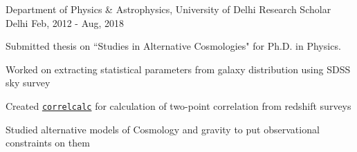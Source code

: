 

\begin{cventries}
	
	\cventry
	{Department of Physics \& Astrophysics, University of Delhi} %
	{Research Scholar} %
	{Delhi} %
	{Feb, 2012 - Aug, 2018} %
	{
		\begin{cvitems} 
			\item {Submitted thesis on ``Studies in Alternative Cosmologies" for Ph.D. in Physics.}
			\item {Worked on extracting statistical parameters from galaxy distribution using SDSS sky survey}
			\item {Created  \href{http://github.com/rohinkumar/correlcalc}{\texttt{correlcalc}} for calculation of two-point correlation from redshift surveys}
			\item {Studied alternative models of Cosmology and gravity to put observational constraints on them}
		\end{cvitems}
	}
\end{cventries}

